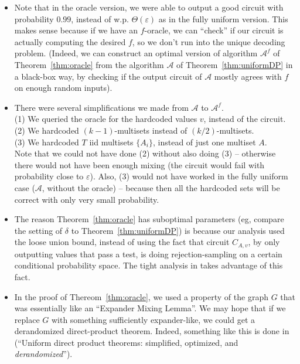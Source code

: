 \documentclass[]{article}
\newcommand{\1}{\mathbb{1}}
\renewcommand{\epsilon}{\varepsilon}
\newcommand{\eps}{\epsilon}
\newcommand{\A}{\mathcal{A}}
\begin{document}
\begin{itemize}
    \item Note that in the oracle version, we were able to output a good circuit
        with probability $0.99$, instead of w.p. $\Theta(\eps)$ as in the fully
        uniform version.
        This makes sense because if we have an $f$-oracle, we can ``check'' if
        our circuit is actually computing the desired $f$, so we don't run into
        the unique decoding problem.
        (Indeed, we can construct an optimal version of algorithm $\A^f$ of
        Theorem~\ref{thm:oracle} from the algorithm $\A$ of
        Theorem~\ref{thm:uniformDP} in a black-box way,
        by checking if the output circuit of $\A$ mostly agrees
        with $f$ on enough random inputs).

    \item There were several simplifications we made from $\A$ to $\A^f$.\\
        (1) We queried the oracle for the hardcoded values $v$, instead of the
        circuit.\\
        (2) We hardcoded $(k-1)$-multisets instead of $(k/2)$-multisets.\\
        (3) We hardcoded $T$ iid multisets $\{A_i\}$, instead of just one
        multiset $A$.\\
        Note that we could not have done (2) without also doing (3) -- otherwise
        there would not have been enough mixing (the circuit would fail with
        probability close to $\eps$).
        Also, (3) would not have worked in the fully uniform case ($\A$, without the
        oracle) -- because then all the hardcoded sets will be correct with only very
        small probability.

    \item The reason Theorem~\ref{thm:oracle} has suboptimal parameters (eg, compare
        the setting of $\delta$ to Theorem~\ref{thm:uniformDP}) is because our
        analysis used the loose union bound, instead of using the fact that
        circuit $C_{A, v}$, by only outputting values that pass a test, is doing
        rejection-sampling on a certain conditional probability space.
        The tight analysis in \cite{IJKW} takes advantage of this fact.

    \item In the proof of Thereom~\ref{thm:oracle}, we used a property of the
        graph $G$ that was essentially like an ``Expander Mixing Lemma''.
        We may hope that if we replace $G$ with something sufficiently
        expander-like, we could get a derandomized direct-product theorem.
        Indeed, something like this is done in \cite{IJKW}
        (``Uniform direct product theorems: simplified, optimized, and
        {\it derandomized}'').


\end{itemize}
\end{document}
